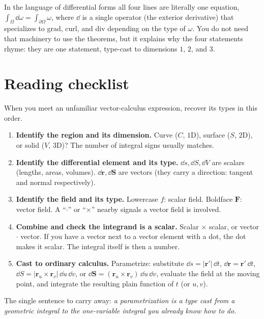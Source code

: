 \documentclass{essay}
\newcommand{\F}{\mathbf{F}}
\newcommand{\rr}{\mathbf{r}}
\begin{document}
In the language of differential forms all four lines are literally one equation,
\(\int_{\Omega} \dd\omega = \int_{\partial\Omega}\omega\), where \(\dd\) is a single
operator (the exterior derivative) that specializes to grad, curl, and div depending
on the type of \(\omega\). You do not need that machinery to use the theorems, but it
explains why the four statements rhyme: they are one statement, type-cast to
dimensions \(1\), \(2\), and \(3\).

\section{Reading checklist}

When you meet an unfamiliar vector-calculus expression, recover its types in this
order.

\begin{enumerate}[leftmargin=1.6em]
  \item \textbf{Identify the region and its dimension.} Curve (\(C\), \(1\)D), surface
    (\(S\), \(2\)D), or solid (\(V\), \(3\)D)? The number of integral signs usually matches.
  \item \textbf{Identify the differential element and its type.} \(\dd s,\dd S,\dd V\)
    are scalars (lengths, areas, volumes). \(\dd\mathbf{r},\dd\mathbf{S}\) are vectors
    (they carry a direction: tangent and normal respectively).
  \item \textbf{Identify the field and its type.} Lowercase \(f\): scalar field.
    Boldface \(\F\): vector field. A ``\(\cdot\)'' or ``\(\times\)'' nearby signals a vector
    field is involved.
  \item \textbf{Combine and check the integrand is a scalar.} Scalar \(\times\) scalar,
    or vector \(\cdot\) vector. If you have a vector next to a vector element with a dot,
    the dot makes it scalar. The integral itself is then a number.
  \item \textbf{Cast to ordinary calculus.} Parametrize: substitute
    \(\dd s=\lvert\rr'\rvert\,\dd t\), \(\dd\mathbf{r}=\rr'\,\dd t\),
    \(\dd S=\lvert\rr_{u}\times\rr_{v}\rvert\,\dd u\,\dd v\), or
    \(\dd\mathbf{S}=(\rr_{u}\times\rr_{v})\,\dd u\,\dd v\), evaluate the field at the moving
    point, and integrate the resulting plain function of \(t\) (or \(u,v\)).
\end{enumerate}

The single sentence to carry away: \emph{a parametrization is a type cast from a
geometric integral to the one-variable integral you already know how to do.}
\end{document}
